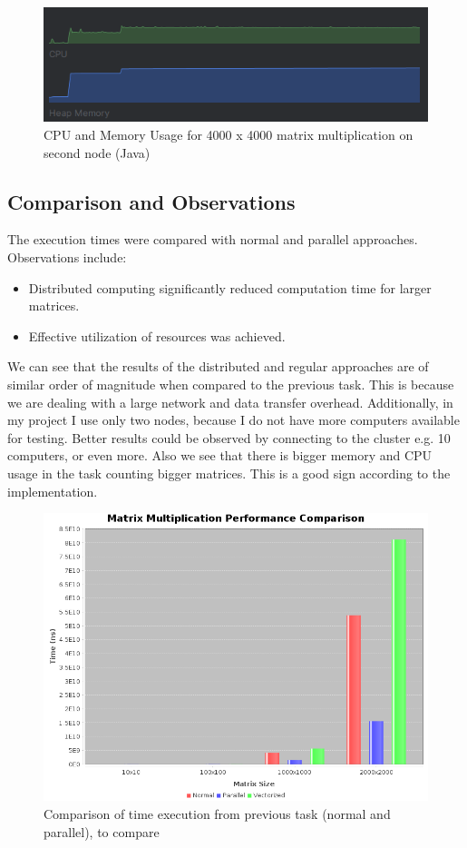 \documentclass{article}
\begin{document}
\begin{figure}[H]
    \centering
    \includegraphics[width=\textwidth]{4000_java_plot_1.png}
    \caption{CPU and Memory Usage for 4000 x 4000 matrix multiplication on second node (Java)}
\end{figure}

\subsection{Comparison and Observations}
The execution times were compared with normal and parallel approaches. Observations include:
\begin{itemize}
    \item Distributed computing significantly reduced computation time for larger matrices.
    \item Effective utilization of resources was achieved.
\end{itemize}

We can see that the results of the distributed and regular approaches are of similar order of magnitude when compared to the previous task. This is because we are dealing with a large network and data transfer overhead. Additionally, in my project I use only two nodes, because I do not have more computers available for testing. Better results could be observed by connecting to the cluster e.g. 10 computers, or even more.
Also we see that there is bigger memory and CPU usage in the task counting bigger matrices. This is a good sign according to the implementation.

\begin{figure}[H]
    \centering
    \includegraphics[width=\textwidth]{CompareTimeBig.png}
    \caption{Comparison of time execution from previous task (normal and parallel), to compare}
\end{figure}
\end{document}
